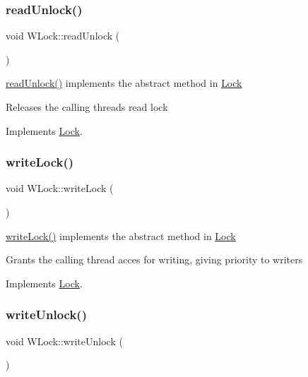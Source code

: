 \subsubsection{\texorpdfstring{read\+Unlock()}{readUnlock()}}
{\footnotesize\ttfamily void W\+Lock\+::read\+Unlock (\begin{DoxyParamCaption}{ }\end{DoxyParamCaption})\hspace{0.3cm}{\ttfamily [virtual]}}



\hyperlink{class_w_lock_aaa017b4c3f8c3b8f0e5b43f80b9cad20}{read\+Unlock()} implements the abstract method in \hyperlink{class_lock}{Lock} 

Releases the calling thread\textquotesingle{}s read lock 

Implements \hyperlink{class_lock}{Lock}.

\mbox{\label{class_w_lock_a201118ef4920d6a9333b4bd0b15eddc9}} 
\subsubsection{\texorpdfstring{write\+Lock()}{writeLock()}}
{\footnotesize\ttfamily void W\+Lock\+::write\+Lock (\begin{DoxyParamCaption}{ }\end{DoxyParamCaption})\hspace{0.3cm}{\ttfamily [virtual]}}



\hyperlink{class_w_lock_a201118ef4920d6a9333b4bd0b15eddc9}{write\+Lock()} implements the abstract method in \hyperlink{class_lock}{Lock} 

Grants the calling thread acces for writing, giving priority to writers 

Implements \hyperlink{class_lock}{Lock}.

\mbox{\label{class_w_lock_a7070d23ba439b826e2310d9ffc65006e}} 
\subsubsection{\texorpdfstring{write\+Unlock()}{writeUnlock()}}
{\footnotesize\ttfamily void W\+Lock\+::write\+Unlock (\begin{DoxyParamCaption}{ }\end{DoxyParamCaption})\hspace{0.3cm}{\ttfamily [virtual]}}



